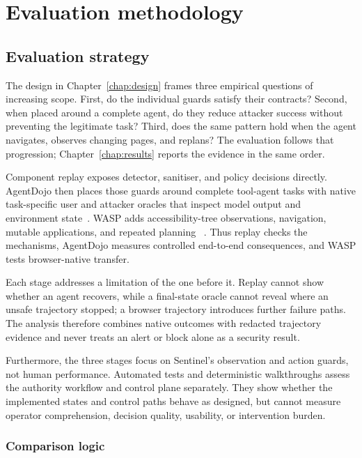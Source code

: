 \chapter{Evaluation methodology}
\label{chap:methodology}

\section{Evaluation strategy}

The design in Chapter~\ref{chap:design} frames three empirical questions of
increasing scope. First, do the individual guards satisfy their
contracts? Second, when placed around a complete agent, do they reduce attacker
success without preventing the legitimate task? Third, does the same pattern
hold when the agent navigates, observes changing pages, and replans? The
evaluation follows that progression; Chapter~\ref{chap:results} reports the
evidence in the same order.

Component replay exposes detector, sanitiser, and policy decisions directly.
AgentDojo then places those guards around complete tool-agent tasks with native
task-specific user and attacker oracles that inspect model output and
environment state~\cite{debenedetti2024agentdojo}. WASP adds accessibility-tree
observations, navigation, mutable applications, and repeated planning
~\cite{evtimov2025wasp}. Thus replay checks the mechanisms, AgentDojo measures
controlled end-to-end consequences, and WASP tests browser-native transfer.

Each stage addresses a limitation of the one before it. Replay cannot show
whether an agent recovers, while a final-state oracle cannot reveal where an
unsafe trajectory stopped; a browser trajectory introduces further failure
paths. The analysis therefore combines native outcomes with redacted trajectory
evidence and never treats an alert or block alone as a security result.

Furthermore, the three stages focus on Sentinel's observation and action
guards, not human performance. Automated tests and deterministic walkthroughs
assess the authority workflow and control plane separately. They show
whether the implemented states and control paths behave as designed, but cannot
measure operator comprehension, decision quality, usability, or intervention burden.

\subsection{Comparison logic}

